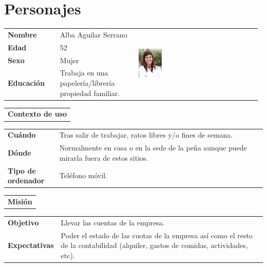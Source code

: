 \documentclass[11pt]{article}
\begin{document}
\section{Personajes}
\begin{table}[H]
	\centering
	\begin{tabular}{p{0.2\linewidth}|p{0.3\linewidth}p{0.475\linewidth}}
		\toprule
		\textbf{Nombre} & Alba Aguilar Serrano &\multirow{4}{*}{\begin{minipage}{1.\textwidth}\includegraphics[width=0.2\textwidth, height=30mm]{Ana}\end{minipage}}\\
		\textbf{Edad} & 52 & \\
		\textbf{Sexo} & Mujer & \\
		\textbf{Educación} & Trabaja en una papelería/librería propiedad familiar.  & \\
		\bottomrule
	\end{tabular}
	
	\begin{tabular}{l}
		\textbf{Contexto de uso} 
	\end{tabular}
	
	\begin{tabular}{p{0.2\linewidth}|p{0.8\linewidth}}
		\toprule
		\textbf{Cuándo} & Tras salir de trabajar, ratos libres y/o fines de semana.\\
		\textbf{Dónde}  & Normalmente en casa o en la sede de la peña aunque puede mirarla fuera de estos sitios.\\
		\textbf{Tipo de ordenador} & Teléfono móvil.\\
		\bottomrule
	\end{tabular}
	
	\begin{tabular}{l}
		\textbf{Misión} 
	\end{tabular}
	
	\begin{tabular}{p{0.2\linewidth}|p{0.8\linewidth}}
		\toprule
		\textbf{Objetivo} & Llevar las cuentas de la empresa.
		\\
		\textbf{Expectativas}  & Poder el estado de las cuotas de la empresa así como el resto de la contabilidad (alquiler, gastos de comidas, actividades, etc). \\
		\bottomrule
	\end{tabular}
	

\end{table}
\end{document}
